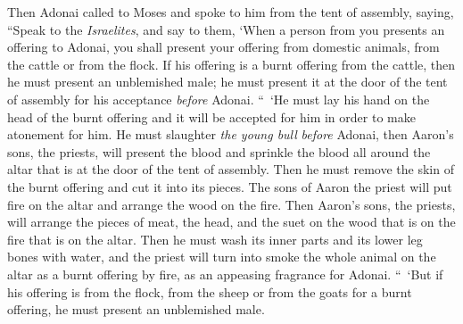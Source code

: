 
\begin{biblechapter} %
 Then Adonai called to Moses and spoke to him from the tent of assembly, saying,
\verse “Speak to the \textit{Israelites}, and say to them, ‘When a person from you presents an offering to Adonai, you shall present your offering from domestic animals, from the cattle or from the flock.
\verse If his offering is a burnt offering from the cattle, then he must present an unblemished male; he must present it at the door of the tent of assembly for his acceptance \textit{before} Adonai.
\verse “ ‘He must lay his hand on the head of the burnt offering and it will be accepted for him in order to make atonement for him.
\verse He must slaughter \textit{the young bull} \textit{before} Adonai, then Aaron’s sons, the priests, will present the blood and sprinkle the blood all around the altar that is at the door of the tent of assembly.
\verse Then he must remove the skin of the burnt offering and cut it into its pieces.
\verse The sons of Aaron the priest will put fire on the altar and arrange the wood on the fire.
\verse Then Aaron’s sons, the priests, will arrange the pieces of meat, the head, and the suet on the wood that is on the fire that is on the altar.
\verse Then he must wash its inner parts and its lower leg bones with water, and the priest will turn into smoke the whole animal on the altar as a burnt offering by fire, as an appeasing fragrance for Adonai.
\verse “ ‘But if his offering is from the flock, from the sheep or from the goats for a burnt offering, he must present an unblemished male.

\end{biblechapter}
